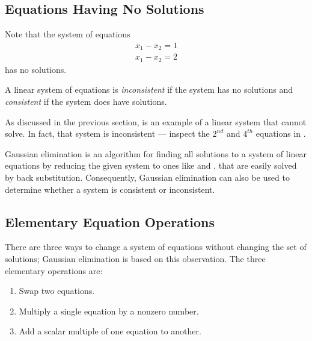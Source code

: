 \documentclass{ximera}
\begin{document}
\subsection*{Equations Having No Solutions}

Note that the system of equations
\begin{eqnarray*}
x_1 - x_2 = 1\\
x_1 - x_2 = 2
\end{eqnarray*}
has no solutions.

\begin{Def}
A linear system of equations is {\em inconsistent\/} if the
system has no solutions and {\em consistent\/} if the system
does have solutions.
\end{Def}  

As discussed in the previous section,  is an example
of a linear system that \Matlab cannot solve.  In fact, that
system is inconsistent --- inspect the $2^{nd}$ and $4^{th}$
equations in .

Gaussian elimination is an algorithm for finding all solutions
to a system of linear equations by reducing the given system to
ones like  and , that are easily solved by
back substitution.  Consequently, Gaussian elimination can also be
used to determine whether a system is consistent or inconsistent.

\subsection*{Elementary Equation Operations}

There are three ways to change a system of equations without
changing the set of solutions; Gaussian elimination
 is based on this observation.  The
three elementary operations are:
\begin{enumerate}
\item   Swap two equations.
\item   Multiply a single equation by a nonzero number.
\item   Add a scalar multiple of one equation to another.
\end{enumerate}
\end{document}
